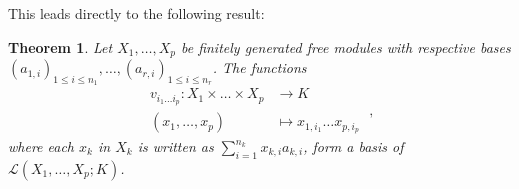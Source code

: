 \documentclass{report}
\newtheorem{thrm}{Theorem}
\theoremstyle{definition}
\theoremstyle{remark}
\begin{document}
\bigskip
This leads directly to the following result:
\begin{thrm} \label{thrmBasisMultiLinear}
        Let $X_1,\dots, X_p$ be finitely generated free modules with respective bases $(a_{1,i})_{1\leq i \leq n_1},\dots,(a_{r,i})_{1 \leq i \leq n_r}$.
        The functions
        \begin{equation*}
                \begin{split}
                        v_{i_1 \dots i_p} : X_1 \times \dots \times X_p & \to K \\
                         (x_1,\dots,x_p) & \mapsto x_{1,i_1}\dots x_{p,i_p}
                \end{split}\;,
           \end{equation*} 
where  each $x_k$ in $X_k$ is written as $\sum_{i=1}^{n_k} x_{k,i}a_{k,i}$, form a basis of $\mathcal{L}(X_1,\dots,X_p;K)$.
\end{thrm}
\end{document}
